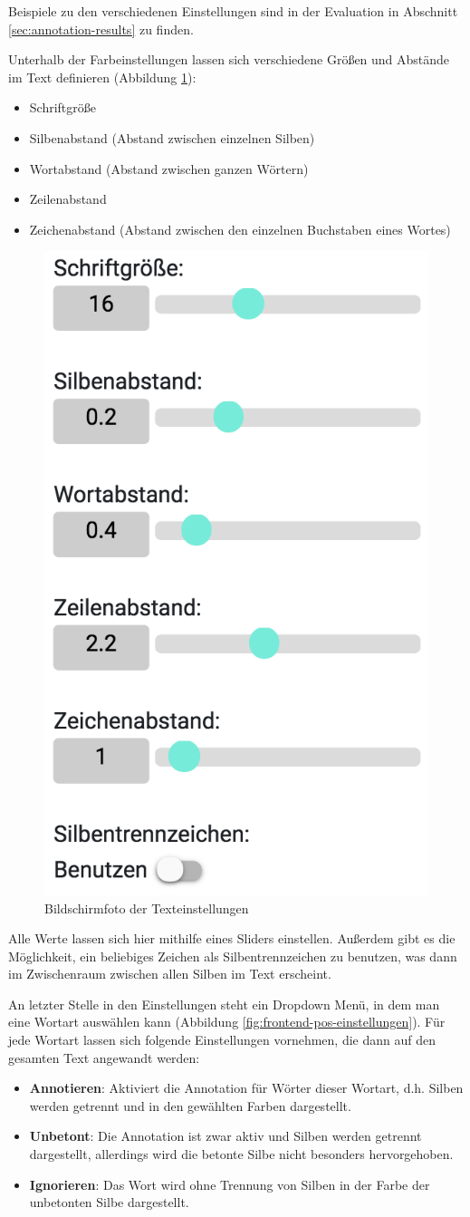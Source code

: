 Beispiele zu den verschiedenen Einstellungen sind in der Evaluation in Abschnitt \ref{sec:annotation-results} zu finden.

Unterhalb der Farbeinstellungen lassen sich verschiedene Größen und Abstände im Text definieren (Abbildung \ref{fig:frontend-textconf}):
\begin{itemize}
	\item Schriftgröße
	\item Silbenabstand (Abstand zwischen einzelnen Silben)
	\item Wortabstand (Abstand zwischen ganzen Wörtern)
	\item Zeilenabstand
	\item Zeichenabstand (Abstand zwischen den einzelnen Buchstaben eines Wortes)
\end{itemize}

\begin{figure}[h!]
	\centering
	\includegraphics[width=.4\linewidth, frame]{figures/frontend/config-text}
	\caption{Bildschirmfoto der Texteinstellungen}
	\label{fig:frontend-textconf}
\end{figure}

Alle Werte lassen sich hier mithilfe eines Sliders einstellen. Außerdem gibt es die Möglichkeit, ein beliebiges Zeichen als Silbentrennzeichen zu benutzen, was dann im Zwischenraum zwischen allen Silben im Text erscheint.

An letzter Stelle in den Einstellungen steht ein Dropdown Menü, in dem man eine Wortart auswählen kann (Abbildung \ref{fig:frontend-pos-einstellungen}). Für jede Wortart lassen sich folgende Einstellungen vornehmen, die dann auf den gesamten Text angewandt werden:
\begin{itemize}
	\item \textbf{Annotieren}: Aktiviert die Annotation für Wörter dieser Wortart, d.h. Silben werden getrennt und in den gewählten Farben dargestellt.
	
	\item \textbf{Unbetont}: Die Annotation ist zwar aktiv und Silben werden getrennt dargestellt, allerdings wird die betonte Silbe nicht besonders hervorgehoben.
	
	\item \textbf{Ignorieren}: Das Wort wird ohne Trennung von Silben in der Farbe der unbetonten Silbe dargestellt.
\end{itemize}

